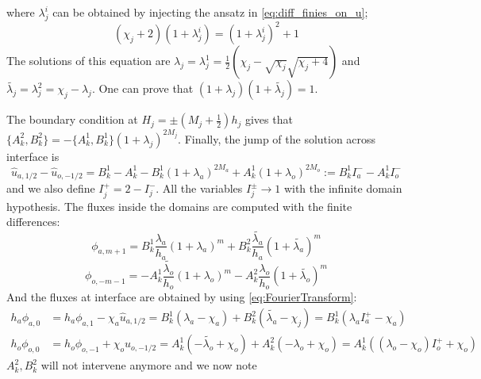 where $\lambda_j^i$ can be obtained by injecting
the ansatz in \eqref{eq:diff_finies_on_u};
\begin{equation*}
(\chi_j+2) (1+\lambda_j^i) = (1+\lambda_j^i)^2 + 1
\end{equation*}
The solutions of this equation are
$\lambda_j = \lambda_j^1 =
\frac{1}{2}\left(\chi_j - \sqrt{\chi_j}\sqrt{\chi_j+4}\right)$ and
$\widetilde{\lambda_j}=\lambda_j^2 = \chi_j - \lambda_j$.
One can prove that $(1+\lambda_j)(1+\widetilde{\lambda_j}) = 1$.
\par
The boundary condition at $H_j = \pm(M_j + \frac{1}{2}) h_j$ gives that
$\{{A}_k^2,{B}_k^2\} = - \{{A}_k^1,{B}_k^1\}
\left(1+\lambda_j\right)^{2 M_j}$.
Finally, the jump of the solution across interface is
\begin{equation*}
\widehat{u}_{a, 1/2} - 
\widehat{u}_{o, -1/2} = B_k^1 - A_k^1
- B_k^1\left(1+\lambda_a\right)^{2M_a}
+ A_k^1\left(1+\lambda_o\right)^{2M_o}
	:= B_k^1 I_a^{-} - A_k^1 I_o^{-}
\end{equation*}
and we also define $I_j^{+} = 2-I_j^{-}$. All the variables
$I_j^{\pm}\rightarrow 1$ with the infinite domain hypothesis.
The fluxes inside the domains are computed
with the finite differences:
\begin{equation}
	\label{eq:OASchwarz_appendix_phiaDiscrete}
\phi_{a,m+1} = B_k^1 \frac{\lambda_a}{h_a}
	(1+\lambda_a)^m + B_k^2 \frac{\widetilde{\lambda_a}}{h_a}
	(1+\widetilde{\lambda_a})^m
\end{equation}
\begin{equation}
	\label{eq:OASchwarz_appendix_phioDiscrete}
\phi_{o,-m-1} = -A_k^1 \frac{\widetilde{\lambda_o}}{h_o}
	(1+\lambda_o)^m - A_k^2 \frac{{\lambda_o}}{h_o}
	(1+\widetilde{\lambda_o})^m
\end{equation}
And the fluxes at interface are obtained 
by using \eqref{eq:FourierTransform}:
\begin{equation*}
\begin{aligned}
h_a\phi_{a,0}&= h_a\phi_{a,1} - \chi_a \widehat{u}_{a, 1/2}
= B_k^1 \left(\lambda_a - \chi_a\right) +
	B_k^2\left(\widetilde{\lambda_a} - \chi_j\right)
	= B_k^1 ({\lambda_a} I_a^{+} - \chi_a)
\\
h_o\phi_{o,0}&= h_o\phi_{o,-1} + \chi_o \widehat{u}_{o, -1/2}
	= A_k^1 \left(-\widetilde{\lambda_o} + \chi_o\right) +
	{A}_k^2 \left(-{\lambda_o} + \chi_o\right)
	=A_k^1(({\lambda_o}-\chi_o)I_o^{+} + \chi_o)
\end{aligned}
\end{equation*}
$A_k^2, B_k^2$ will not intervene anymore and we now note
